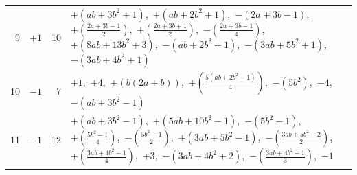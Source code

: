 {\begin{longtable}{@{}rcrp{}@{}}
9 & $+1$ & 10 & $+(a b + 3 b^{2} + 1)$,\ $+(a b + 2 b^{2} + 1)$,\ $-(2 a + 3 b - 1)$,\ $+(\frac{2 a + 3 b - 1}{2})$,\ $+(\frac{2 a + 3 b + 1}{2})$,\ $-(\frac{2 a + 3 b - 1}{4})$,\ $+(8 a b + 13 b^{2} + 3)$,\ $-(a b + 2 b^{2} + 1)$,\ $-(3 a b + 5 b^{2} + 1)$,\ $-(3 a b + 4 b^{2} + 1)$ \\
10 & $-1$ & 7 & $+1$,\ $+4$,\ $+(b \left(2 a + b\right))$,\ $+(\frac{5 \left(a b + 2 b^{2} - 1\right)}{4})$,\ $-(5 b^{2})$,\ $-4$,\ $-(a b + 3 b^{2} - 1)$ \\
11 & $-1$ & 12 & $+(a b + 3 b^{2} - 1)$,\ $+(5 a b + 10 b^{2} - 1)$,\ $-(5 b^{2} - 1)$,\ $+(\frac{5 b^{2} - 1}{4})$,\ $-(\frac{5 b^{2} + 1}{2})$,\ $+(3 a b + 5 b^{2} - 1)$,\ $-(\frac{3 a b + 5 b^{2} - 2}{2})$,\ $+(\frac{3 a b + 4 b^{2} - 1}{4})$,\ $+3$,\ $-(3 a b + 4 b^{2} + 2)$,\ $-(\frac{3 a b + 4 b^{2} - 1}{3})$,\ $-1$ \\
\bottomrule\end{longtable}}
